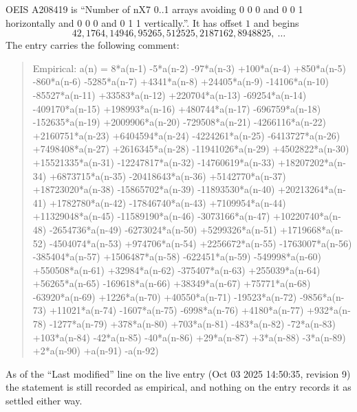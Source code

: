 \documentclass[11pt,a4paper]{article}
\theoremstyle{plain}
\theoremstyle{definition}
\begin{document}
OEIS A208419 is ``Number of nX7 0..1 arrays avoiding 0 0 0 and 0 0 1 horizontally and 0 0 0 and 0 1 1 vertically.''. It has offset
$1$ and begins
\[
42, 1764, 14946, 95265, 512525, 2187162, 8948825,\ \dots
\]
The entry carries the following comment:
\begin{quote}\small
Empirical: a(n) = 8*a(n-1) -5*a(n-2) -97*a(n-3) +100*a(n-4) +850*a(n-5) -860*a(n-6) -5285*a(n-7) +4341*a(n-8) +24405*a(n-9) -14106*a(n-10) -85527*a(n-11) +33583*a(n-12) +220704*a(n-13) -69254*a(n-14) -409170*a(n-15) +198993*a(n-16) +480744*a(n-17) -696759*a(n-18) -152635*a(n-19) +2009906*a(n-20) -729508*a(n-21) -4266116*a(n-22) +2160751*a(n-23) +6404594*a(n-24) -4224261*a(n-25) -6413727*a(n-26) +7498408*a(n-27) +2616345*a(n-28) -11941026*a(n-29) +4502822*a(n-30) +15521335*a(n-31) -12247817*a(n-32) -14760619*a(n-33) +18207202*a(n-34) +6873715*a(n-35) -20418643*a(n-36) +5142770*a(n-37) +18723020*a(n-38) -15865702*a(n-39) -11893530*a(n-40) +20213264*a(n-41) +1782780*a(n-42) -17846740*a(n-43) +7109954*a(n-44) +11329048*a(n-45) -11589190*a(n-46) -3073166*a(n-47) +10220740*a(n-48) -2654736*a(n-49) -6273024*a(n-50) +5299326*a(n-51) +1719668*a(n-52) -4504074*a(n-53) +974706*a(n-54) +2256672*a(n-55) -1763007*a(n-56) -385404*a(n-57) +1506487*a(n-58) -622451*a(n-59) -549998*a(n-60) +550508*a(n-61) +32984*a(n-62) -375407*a(n-63) +255039*a(n-64) +56265*a(n-65) -169618*a(n-66) +38349*a(n-67) +75771*a(n-68) -63920*a(n-69) +1226*a(n-70) +40550*a(n-71) -19523*a(n-72) -9856*a(n-73) +11021*a(n-74) -1607*a(n-75) -6998*a(n-76) +4180*a(n-77) +932*a(n-78) -1277*a(n-79) +378*a(n-80) +703*a(n-81) -483*a(n-82) -72*a(n-83) +103*a(n-84) -42*a(n-85) -40*a(n-86) +29*a(n-87) +3*a(n-88) -3*a(n-89) +2*a(n-90) +a(n-91) -a(n-92)
\end{quote}
As of the ``Last modified'' line on the live entry (Oct 03 2025 14:50:35, revision
9) the statement is still recorded as empirical, and nothing on the entry
records it as settled either way.
\end{document}

